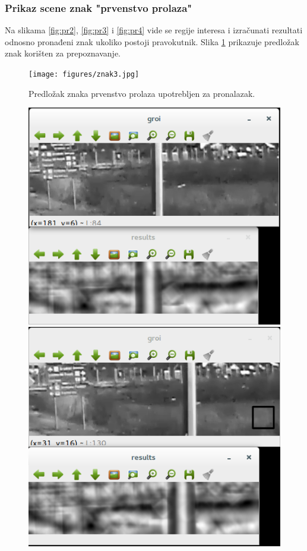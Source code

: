 \clearpage
\subsubsection*{Prikaz scene znak "prvenstvo prolaza"}

Na slikama \ref{fig:pr2}, \ref{fig:pr3} i \ref{fig:pr4} vide se 
regije interesa i izračunati rezultati odnosno pronađeni znak ukoliko postoji
pravokutnik. Slika \ref{fig:pr1} prikazuje predložak znak korišten za 
prepoznavanje.

\begin{figure}[!htb]
\centering
\texttt{[image: figures/znak3.jpg]}
\caption{Predložak znaka prvenstvo prolaza upotrebljen za pronalazak.}
\label{fig:pr1}
\end{figure} 

\begin{figure}[!htb]
    \includegraphics[width=\linewidth]{figures/14.png}
\endminipage\hfill
{}
    \includegraphics[width=\linewidth]{figures/15.png}

\end{figure}

